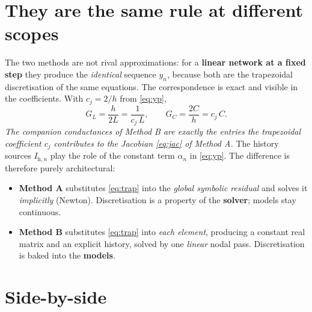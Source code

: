 \documentclass[11pt]{article}
\newcommand{\hstep}{h}
\begin{document}
\section{They are the same rule at different scopes}

The two methods are not rival approximations: for a \textbf{linear network at a
fixed step} they produce the \emph{identical} sequence $y_n$, because both are
the trapezoidal discretisation of the same equations. The correspondence is
exact and visible in the coefficients. With $c_j = 2/\hstep$ from
\eqref{eq:yp},
\begin{equation}
G_L = \frac{\hstep}{2L} = \frac{1}{c_j\,L},
\qquad
G_C = \frac{2C}{\hstep} = c_j\,C .
\label{eq:equiv}
\end{equation}
\emph{The companion conductances of Method B are exactly the entries the
trapezoidal coefficient $c_j$ contributes to the Jacobian \eqref{eq:jac} of
Method A.} The history sources $I_{\mathrm{h},n}$ play the role of the constant term
$\alpha_n$ in \eqref{eq:yp}. The difference is therefore purely architectural:

\begin{itemize}
\item \textbf{Method A} substitutes \eqref{eq:trap} into the \emph{global
symbolic residual} and solves it \emph{implicitly} (Newton). Discretisation is a
property of the \textbf{solver}; models stay continuous.
\item \textbf{Method B} substitutes \eqref{eq:trap} into \emph{each element},
producing a constant real matrix and an explicit history, solved by one
\emph{linear} nodal pass. Discretisation is baked into the \textbf{models}.
\end{itemize}

\section{Side-by-side}
\end{document}
